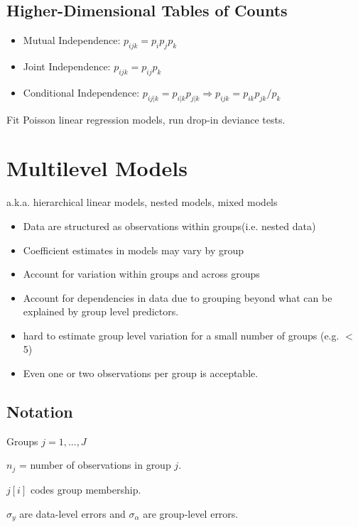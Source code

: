 \documentclass[10pt,landscape, fleqn]{article}
\begin{document}
\begin{multicols}{3}
			\subsection{Higher-Dimensional Tables of Counts}
				\begin{itemize}
					\item Mutual Independence: $p_{ijk}=p_ip_jp_k$
					\item Joint Independence: $p_{ijk}=p_{ij}p_{k}$
					\item Conditional Independence: $p_{ij|k} = p_{i|k}p_{j|k} \Rightarrow p_{ijk}=p_{ik}p_{jk}/p_k$
				\end{itemize}
				Fit Poisson linear regression models, run drop-in deviance tests.
				
		\section{Multilevel Models}
			a.k.a. hierarchical linear models, nested models, mixed models
			\begin{itemize}
				\item Data are structured as observations within groups(i.e. nested data)
				\item Coefficient estimates in models may vary by group
				\item Account for variation within groups and across groups
				\item Account for dependencies in data due to grouping beyond what can be explained by group level predictors.
				\item hard to estimate group level variation for a small number of groups (e.g. $<$ 5)
				\item Even one or two observations per group is acceptable.
			\end{itemize}
			\subsection{Notation}
				Groups $j = 1,...,J$ \par 
				$n_j$ = number of observations in group $j$.\par 
				$j[i]$ codes group membership. \par 
				$\sigma_y$ are data-level errors and $\sigma_\alpha$ are group-level errors.

\end{multicols}
\end{document}
